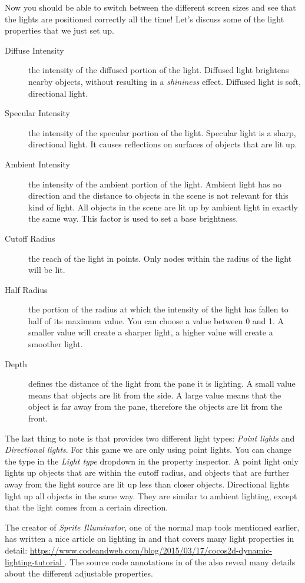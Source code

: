 Now you should be able to switch between the different screen sizes and see that
the lights are positioned correctly all the time! Let's discuss some of the
light properties that we just set up.

\begin{description}
\item[Diffuse Intensity] the intensity of the diffused portion of the light.
Diffused light brightens nearby objects, without resulting in a
\textit{shininess} effect. Diffused light is soft, directional light.
\item[Specular Intensity] the intensity of the specular portion of the light.
Specular light is a sharp, directional light. It causes reflections on surfaces
of objects that are lit up.
\item[Ambient Intensity] the intensity of the ambient portion of the light.
Ambient light has no direction and the distance to objects in the scene is not
relevant for this kind of light. All objects in the scene are lit up by
ambient light in exactly the same way. This factor is used to set a base
brightness.
\item[Cutoff Radius] the reach of the light in points. Only nodes within the
radius of the light will be lit.
\item[Half Radius] the portion of the radius at which the intensity of the light
has fallen to half of its maximum value. You can choose a value between 0 and 1.
A smaller value will create a sharper light, a higher value will create a
smoother light.
\item[Depth] defines the distance of the light from the pane it is lighting. A
small value means that objects are lit from the side. A large value means that
the object is far away from the pane, therefore the objects are lit from the
front.
\end{description}

The last thing to note is that \cocos{} provides two different light types:
\textit{Point lights} and \textit{Directional lights}. For this game we are only
using point lights. You can change the type in the \textit{Light type} dropdown
in the property inspector. A point light only lights up objects that are within
the cutoff radius, and objects that are further away from the light source are
lit up less than closer objects. Directional lights light up all objects in the
same way. They are similar to ambient lighting, except that the light comes from
a certain direction.

\begin{details}[frametitle={More details on lighting}]
The creator of \textit{Sprite Illuminator}, one of the normal map tools
mentioned earlier, has written a nice article on lighting in \SB{} and \cocos{}
that covers many light properties in detail: \url{https://www.codeandweb.com/blog/2015/03/17/cocos2d-dynamic-lighting-tutorial
}. The source code annotations in  of the \cocos{}
also reveal many details about the different adjustable properties.
\end{details}

